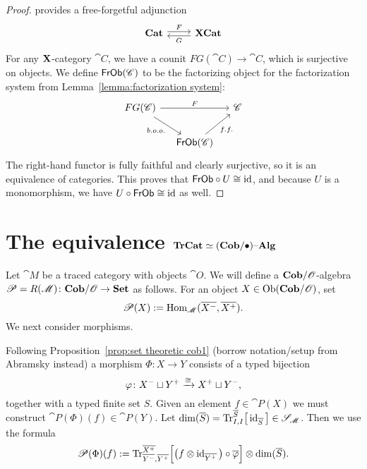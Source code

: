 \documentclass[12pt,oneside,article,draft]{memoir}
\begin{document}
\begin{proof}

\cite{Abramsky} provides a free-forgetful adjunction
$$
\begin{tikzcd}
\Cat{Cat}\arrow[r, shift left=.5ex, "F"]&\Cat{XCat}\arrow[l, shift left=.5ex,"G"]
\end{tikzcd}
$$
For any $\mathbf{X}$-category $\cat{C}$, we have a counit $FG(\cat{C})\to\cat{C}$, which is surjective on objects. We define $\mathsf{FrOb}(\mathscr{C})$ to be the factorizing object for the factorization system from Lemma~\ref{lemma:factorization system}:
$$
\begin{tikzcd}[column sep=small]
FG(\cat{C})\arrow[dr, "b.o.o."']\arrow[rr, "F"]&&\cat{C}\\
&\Fun{FrOb}(\cat{C})\arrow[ur, "f.f."']
\end{tikzcd}
$$
The right-hand functor is fully faithful and clearly surjective, so it is an equivalence of categories. This proves that $\mathsf{FrOb}\circ U\cong\operatorname{id}$, and because $U$ is a monomorphism, we have $U\circ\mathsf{FrOb}\cong\operatorname{id}$ as well.


\end{proof}

\section{The equivalence $\mathbf{TrCat}\simeq(\mathbf{Cob}/\bullet){\text \textendash}\mathbf{Alg}$}\label{sec:first equivalence}

Let $\cat{M}$ be a traced category with objects $\cat{O}$. We will define a $\mathbf{Cob}/\mathscr{O}$-algebra $\mathscr{P}=R(\mathscr{M})\colon\mathbf{Cob}/\mathscr{O}\to\mathbf{Set}$ as follows. For an object $X\in\operatorname{Ob}(\mathbf{Cob}/\mathscr{O})$, set 
$$\mathscr{P}(X):=\operatorname{Hom}_{\mathscr{M}}(\overline{X^-},\overline{X^+}).$$
We next consider morphisms.

Following Proposition~\ref{prop:set theoretic cob1} (borrow notation/setup from Abramsky instead) a morphism $\Phi\colon X\longrightarrow Y$ consists of a typed bijection 
$$\varphi\colon X^-\sqcup Y^+\xrightarrow{\cong}X^+\sqcup Y^-,$$ 
together with a typed finite set $S$. Given an element $f\in\cat{P}(X)$ we must construct $\cat{P}(\Phi)(f)\in\cat{P}(Y)$. Let $\dim(\overline{S})=\textnormal{Tr}^{\overline{S}}_{I,I}\big[\operatorname{id}_{\overline{S}}\big]\in\mathscr{S}_{\mathscr{M}}$. Then we use the formula
$$\mathscr{P}(\Phi)(f):=
\textnormal{Tr}^{\overline{X^+}}_{\overline{Y^-},\overline{Y^+}}\Big[\big(f\otimes\operatorname{id}_{\overline{Y^+}}\big)\circ\overline{\varphi}\Big]
\otimes\dim(\overline{S}).	
$$
\end{document}
